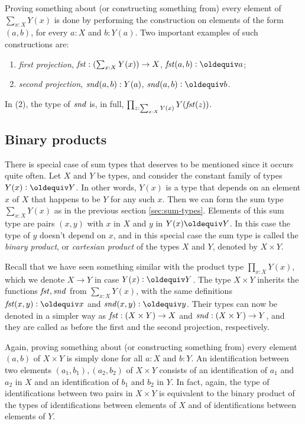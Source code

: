 Proving something about (or constructing something from) every 
element of $\sum _{x:X} Y(x)$ is done by performing the construction on elements of the form $(a,b)$, for every $a:X$ and $b: Y(a)$.
Two important examples of such constructions are:
\begin{enumerate}
\item \emph{first projection}, 
$\mathop{\mathit{fst}}:(\sum _{x:X} Y(x)) \to X$, 
$\fst(a,b)\defeq a$;
\item \emph{second projection},
$\mathop{\mathit{snd}}(a,b): Y(a)$,
$\snd(a,b)\defeq b$.
\end{enumerate}
In (2), the type of $\mathop{\mathit{snd}}$ is, in full,
$\prod_{z:\sum_{x:X} Y(x)} Y(\mathop{\mathit{fst}}(z))$.

\subsection{Binary products}
\label{sec:binprod-types}
There is special case of sum types that deserves to be mentioned since
it occurs quite often. Let $X$ and $Y$ be types, and consider the constant
family of types $Y(x)\defeq Y$. In other words, $Y(x)$ is a type that depends
on an element $x$ of $X$ that happens to be $Y$ for any such $x$.
Then we can form the sum type $\sum_{x:X} Y(x)$ as in the previous
section \ref{sec:sum-types}. Elements of this sum type are pairs $(x,y)$
with $x$ in $X$ and $y$ in $Y(x)\jdeq Y$. In this case the type of $y$
doesn't depend on $x$, and in this special case the sum type is called
the \emph{binary product}, or \emph{cartesian product} of the types $X$ and $Y$,
denoted by $X \times Y$.

Recall that we have seen something similar with the product type
$\prod_{x:X} Y(x)$, which we denote $X\to Y$ in case $Y(x)\defeq Y$.
The type $X \times Y$ inherits the functions $\mathop{\mathit{fst}},\mathop{\mathit{snd}}$ from
$\sum_{x:X} Y(x)$, with the same definitions $\fst(x,y)\defeq x$
and $\snd(x,y)\defeq y$. Their types can now be denoted in a
simpler way as $\mathop{\mathit{fst}}: (X \times Y)\to X$ and 
$\mathop{\mathit{snd}}: (X \times Y)\to Y$, and they are called as before the
first and the second projection, respectively.

Again, proving something about (or constructing something from) every 
element $(a,b)$ of $X \times Y$ is simply done for all $a:X$ and $b:Y$.
An identification between two elements $(a_1,b_1),(a_2,b_2)$ of 
$X \times Y$ consists of an identification of $a_1$ and $a_2$ in $X$
and an identification of $b_1$ and $b_2$ in $Y$. In fact, 
again, the type of identifications between two pairs in $X \times Y$
is equivalent to the binary product of the types of identifications between
elements of $X$ and of identifications between elements of $Y$.


